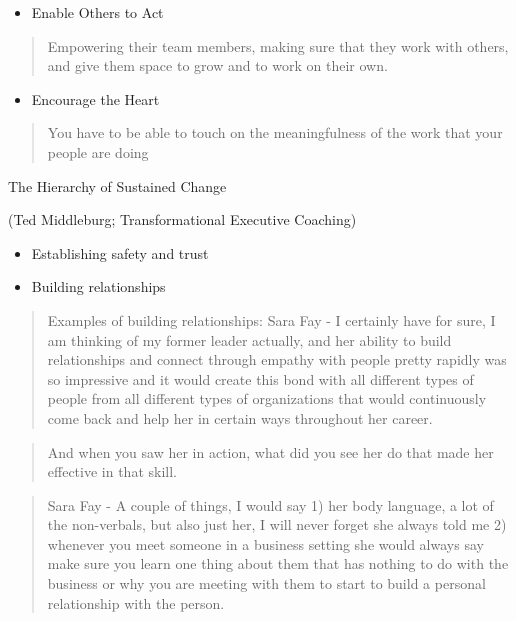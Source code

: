 \documentclass[]{book}
\begin{document}
\begin{itemize}
\item
  Enable Others to Act
\end{itemize}

\begin{quote}
Empowering their team members, making sure that they work with others, and give them space to grow and to work on their own.
\end{quote}

\begin{itemize}
\item
  Encourage the Heart
\end{itemize}

\begin{quote}
You have to be able to touch on the meaningfulness of the work that your people are doing
\end{quote}

The Hierarchy of Sustained Change

(Ted Middleburg; Transformational Executive Coaching)

\begin{itemize}
\item
  Establishing safety and trust
\item
  Building relationships
\end{itemize}

\begin{quote}
Examples of building relationships:
Sara Fay - I certainly have for sure, I am thinking of my former leader actually, and her ability to build relationships and connect through empathy with people pretty rapidly was so impressive and it would create this bond with all different types of people from all different types of organizations that would continuously come back and help her in certain ways throughout her career.
\end{quote}

\begin{quote}
And when you saw her in action, what did you see her do that made her effective in that skill.
\end{quote}

\begin{quote}
Sara Fay - A couple of things, I would say 1) her body language, a lot of the non-verbals, but also just her, I will never forget she always told me 2) whenever you meet someone in a business setting she would always say make sure you learn one thing about them that has nothing to do with the business or why you are meeting with them to start to build a personal relationship with the person.
\end{quote}
\end{document}
